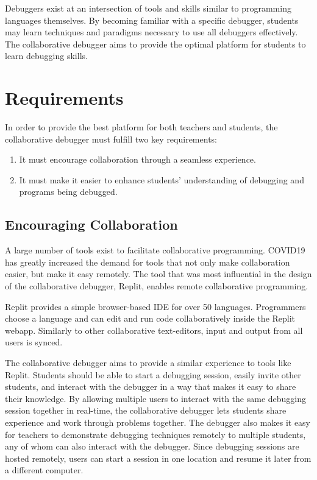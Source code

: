 \documentclass[12pt]{article}
\begin{document}
Debuggers exist at an intersection of tools and skills similar to
programming languages themselves. By becoming familiar with a specific
debugger, students may learn techniques and paradigms necessary to use
all debuggers effectively.  The collaborative debugger aims to provide
the optimal platform for students to learn debugging skills.

\section{Requirements}

In order to provide the best platform for both teachers and students,
the collaborative debugger must fulfill two key requirements:

\begin{enumerate}
\item It must encourage collaboration through a seamless experience.
\item It must make it easier to enhance students' understanding of
  debugging and programs being debugged.
\end{enumerate}

\subsection{Encouraging Collaboration} \label{exisitingcollab}

A large number of tools exist to facilitate collaborative programming.
COVID19 has greatly increased the demand for tools that not only make
collaboration easier, but make it easy remotely.  The tool that was
most influential in the design of the collaborative debugger,
Replit\cite{replit}, enables remote collaborative programming.

Replit provides a simple browser-based IDE for over 50 languages.
Programmers choose a language and can edit and run code
collaboratively inside the Replit webapp.  Similarly to other
collaborative text-editors, input and output from all users is synced.
\par

The collaborative debugger aims to provide a similar experience to
tools like Replit.  Students should be able to start a debugging
session, easily invite other students, and interact with the debugger
in a way that makes it easy to share their knowledge.  By allowing
multiple users to interact with the same debugging session together in
real-time, the collaborative debugger lets students share experience
and work through problems together.  The debugger also makes it easy
for teachers to demonstrate debugging techniques remotely to multiple
students, any of whom can also interact with the debugger.  Since
debugging sessions are hosted remotely, users can start a session in
one location and resume it later from a different computer.
\par
\end{document}
